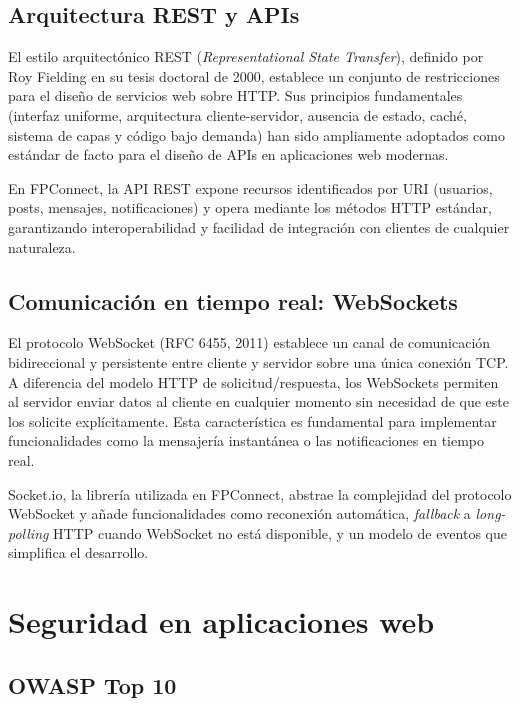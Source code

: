 \documentclass[a4paper]{report}
\begin{document}
\subsection{Arquitectura REST y APIs}

El estilo arquitectónico REST (\textit{Representational State Transfer}), definido por Roy Fielding en su tesis doctoral de 2000, establece un conjunto de restricciones para el diseño de servicios web sobre HTTP. Sus principios fundamentales (interfaz uniforme, arquitectura cliente-servidor, ausencia de estado, caché, sistema de capas y código bajo demanda) han sido ampliamente adoptados como estándar de facto para el diseño de APIs en aplicaciones web modernas.

En FPConnect, la API REST expone recursos identificados por URI (usuarios, posts, mensajes, notificaciones) y opera mediante los métodos HTTP estándar, garantizando interoperabilidad y facilidad de integración con clientes de cualquier naturaleza.

\subsection{Comunicación en tiempo real: WebSockets}

El protocolo WebSocket (RFC 6455, 2011) establece un canal de comunicación bidireccional y persistente entre cliente y servidor sobre una única conexión TCP. A diferencia del modelo HTTP de solicitud/respuesta, los WebSockets permiten al servidor enviar datos al cliente en cualquier momento sin necesidad de que este los solicite explícitamente. Esta característica es fundamental para implementar funcionalidades como la mensajería instantánea o las notificaciones en tiempo real.

Socket.io, la librería utilizada en FPConnect, abstrae la complejidad del protocolo WebSocket y añade funcionalidades como reconexión automática, \textit{fallback} a \textit{long-polling} HTTP cuando WebSocket no está disponible, y un modelo de eventos que simplifica el desarrollo.

\section{Seguridad en aplicaciones web}

\subsection{OWASP Top 10}
\end{document}
